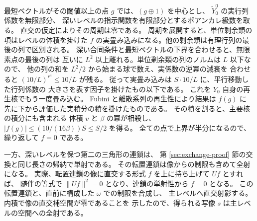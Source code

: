 最短ベクトルがその閾値以上の点 \(g\) では、\((g\oplus1)\) を中心とし、
\(\widetilde Y_0^0\) の実行列係数を無限部分、
深いレベルの指示関数を有限部分とするポアンカレ級数を取る。
直交の仮定によりその周期は零である。
周期を展開すると、単位剰余類の項はレベルの体積を掛けた
\(f\) の実畳み込みになる。他の剰余類は有理行列の最後の列で区別される。
深い合同条件と最短ベクトルの下界を合わせると、無限素点の最後の列は
互いに \(L^2\) 以上離れる。単位剰余類の列のノルムは \(L\) 以下なので、
他の列の和を \(L^2/2\) から始まる球で数え、実係数の逆冪の減衰を
合わせると \((10/L)^{r^4}\le 10/L\) が残る。
従って実畳み込みは \(S\cdot10/L\) に、平行移動した行列係数の
大きさを表す因子を掛けたもの以下である。
これを \(Y_0\) 自身の再生核でもう一度畳み込む。
Fubini と離散系列の再生性により結果は \(f(g)\) に
先に下から評価した実積分の積を掛けたものである。
その積を割ると、主要核の積分にも含まれる
体積 \(v\) と \(\beta\) の冪が相殺し、
\(|f(g)|\le (10/(16\beta))S\le S/2\) を得る。
全ての点で上界が半分になるので、繰り返して \(f=0\) である。

一方、深いレベルを保つ第二の三角形の連鎖は、
第 \ref{sec:exchange-proof} 節の交換と同じ長さの帰納で単射である。
その転置連鎖は像からの制限も含めて全射になる。
実際、転置連鎖の像に直交する形式 \(f\) を上に持ち上げて \(Uf\) とすれば、
随伴の等式で \(\|Uf\|^2=0\) となり、連鎖の単射性から \(f=0\) となる。
この転置連鎖と、直前に構成した \(\omega\) での制限を合成し、
主レベルへ直交射影する。内積で像の直交補空間が零であることを
示したので、得られる写像 \(s\) は主レベルの空間への全射である。
